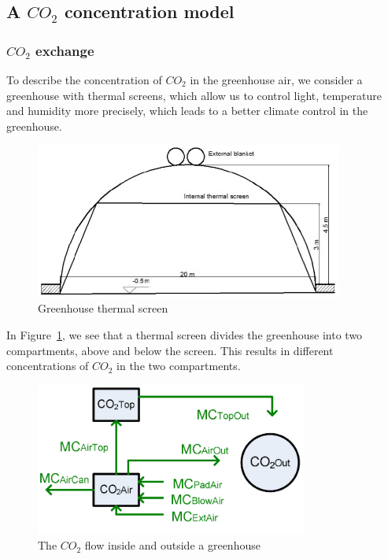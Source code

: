 \documentclass[a4paper]{article}
\numberwithin{equation}{section}
\begin{document}
\subsection{A \texorpdfstring{\(CO_2\)}{} concentration model}
\subsubsection{\texorpdfstring{\(CO_2\)}{} exchange}
To describe the concentration of \(CO_2\) in the greenhouse air, we consider a greenhouse with thermal screens, which allow us to control light, temperature and humidity more precisely, which leads to a better climate control in the greenhouse.
\begin{figure}[H]
  \centering
  \includegraphics[width=0.9\textwidth]{thrscr.png}
  \caption{Greenhouse thermal screen}\label{fig:thrscr}
\end{figure}

In Figure~\ref{fig:thrscr}, we see that a thermal screen divides the greenhouse into two compartments, above and below the screen.
This results in different concentrations of \(CO_2\) in the two compartments.
\begin{figure}[H]
  \centering
  \includegraphics[width=0.8\textwidth]{CO2}
  \caption{The \(CO_2\) flow inside and outside a greenhouse}\label{fig:CO2}
\end{figure}
\end{document}
